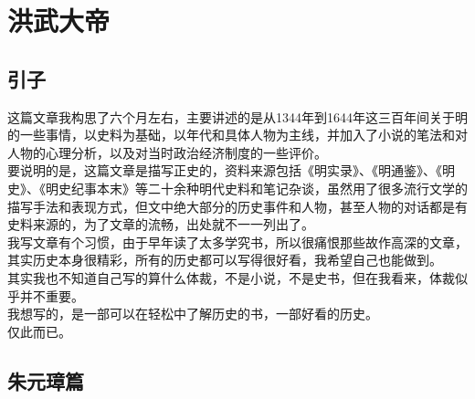 \ifnum{}
\AddToShipoutPicture{\YM}
\fi	
{}%
\fancyhead[RO]{{\tiny{\textcolor{Gray}{\faQuoteRight\ }}}\thepage}
\fancyhead[LE]{{\tiny{\textcolor{Gray}{\faQuoteRight\ }}}\thepage}
\fancyfoot[LE,RO]{}
\fancyfoot[LO,CE]{}
\fancyfoot[CO,RE]{}
\setcounter{part}{0}
\setcounter{chapter}{1}
\setcounter{section}{0}
\part{洪武大帝}
\chapter*{引子}
\ifnum{}
	\begin{multicols}{\theparacolNo}
\fi
这篇文章我构思了六个月左右，主要讲述的是从1344年到1644年这三百年间关于明的一些事情，以史料为基础，以年代和具体人物为主线，并加入了小说的笔法和对人物的心理分析，以及对当时政治经济制度的一些评价。\\

要说明的是，这篇文章是描写正史的，资料来源包括《明实录》、《明通鉴》、《明史》、《明史纪事本末》等二十余种明代史料和笔记杂谈，虽然用了很多流行文学的描写手法和表现方式，但文中绝大部分的历史事件和人物，甚至人物的对话都是有史料来源的，为了文章的流畅，出处就不一一列出了。\\

我写文章有个习惯，由于早年读了太多学究书，所以很痛恨那些故作高深的文章，其实历史本身很精彩，所有的历史都可以写得很好看，我希望自己也能做到。\\

其实我也不知道自己写的算什么体裁，不是小说，不是史书，但在我看来，体裁似乎并不重要。\\

我想写的，是一部可以在轻松中了解历史的书，一部好看的历史。\\

仅此而已。\\
\ifnum{}
	\end{multicols}
\fi
\newpage
\chapter*{朱元璋篇}
